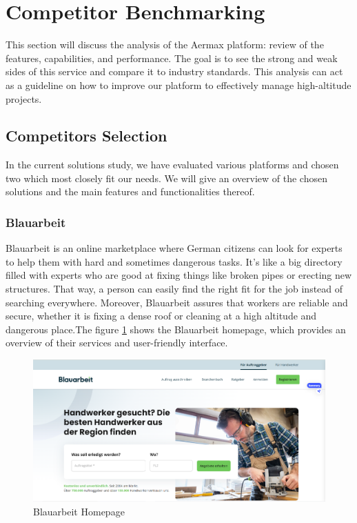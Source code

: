 \section{Competitor Benchmarking}
This section will discuss the analysis of the Aermax platform: review of the features, capabilities, and performance. The goal is to see the strong and weak sides of this service and compare it to industry standards. This analysis can act as a guideline on how to improve our platform to effectively manage high-altitude projects.
\subsection{Competitors Selection}
In the current solutions study, we have evaluated various platforms and chosen two which most closely fit our needs. We will give an overview of the chosen solutions and the main features and functionalities thereof.
\subsubsection*{Blauarbeit \cite{Blauarbeit}} %
Blauarbeit is an online marketplace where German citizens can look for experts to help them with hard and sometimes dangerous tasks. It's like a big directory filled with experts who are good at fixing things like broken pipes or erecting new structures. That way, a person can easily find the right fit for the job instead of searching everywhere. Moreover, Blauarbeit assures that workers are reliable and secure, whether it is fixing a dense roof or cleaning at a high altitude and dangerous place.The figure \ref{fig:blaurabeit_image} shows the Blauarbeit homepage, which provides an overview of their services and user-friendly interface.
\begin{figure}[H]
    \centering
    \includegraphics[width=\linewidth]{src/assets/chapters/Blaurabeit.PNG}
    \caption{Blauarbeit Homepage}
    \label{fig:blaurabeit_image}
\end{figure}

